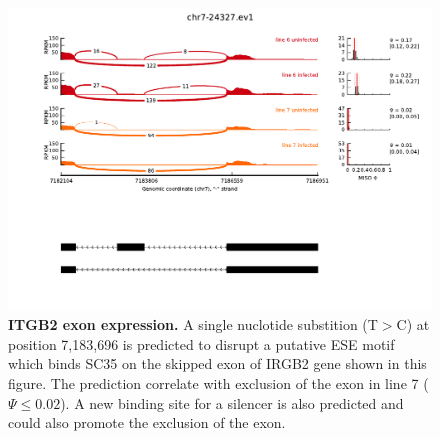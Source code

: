 \documentclass[10pt]{article}
\begin{document}
\begin{figure}[!ht]
    \begin{center}
        \includegraphics[width=6in]{itgb2_miso.pdf}
    \end{center}
    \caption{
        {\bf ITGB2 exon expression.}
        A single nuclotide substition (T$>$C) at position 7,183,696 is predicted to disrupt a putative ESE
        motif which binds SC35 on the skipped exon of IRGB2 gene shown in this figure.
        The prediction correlate with exclusion of the exon in line 7 ($\Psi \leq 0.02$).
        A new binding site for a silencer is also predicted and could also promote the exclusion of the exon. 
    }
    \label{itgb2}
\end{figure}
\end{document}
